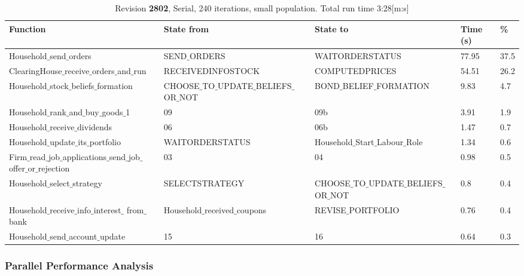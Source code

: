 \begin{landscape}
\begin{table}
\begin{tabular}{|l|l|l|l|l|}\hline
Function & State from & State to & Time (s) & \% \\ \hline
Household$\_$send$\_$orders & SEND$\_$ORDERS & WAITORDERSTATUS &  77.95 & 37.5 \\ \hline
ClearingHouse$\_$receive$\_$orders$\_$and$\_$run & RECEIVEDINFOSTOCK & COMPUTEDPRICES &   54.51 & 26.2 \\ \hline
Household$\_$stock$\_$beliefs$\_$formation & \parbox[t]{6cm}{CHOOSE$\_$TO$\_$UPDATE$\_$BELIEFS$\_$\\[-4pt]OR$\_$NOT} & BOND$\_$BELIEF$\_$FORMATION &   9.83 & 4.7 \\ \hline
Household$\_$rank$\_$and$\_$buy$\_$goods$\_$1 & 09 & 09b &   3.91 & 1.9 \\ \hline
Household$\_$receive$\_$dividends & 06 & 06b &   1.47 & 0.7 \\ \hline
Household$\_$update$\_$its$\_$portfolio & WAITORDERSTATUS & Household$\_$Start$\_$Labour$\_$Role &   1.34 & 0.6 \\ \hline
\parbox[t]{6cm}{Firm$\_$read$\_$job$\_$applications$\_$send$\_$job$\_$\\[-4pt]offer$\_$or$\_$rejection} & 03 & 04 &   0.98 & 0.5 \\ \hline
Household$\_$select$\_$strategy & SELECTSTRATEGY & CHOOSE$\_$TO$\_$UPDATE$\_$BELIEFS$\_$OR$\_$NOT &   0.8 & 0.4 \\ \hline
\parbox[t]{6cm}{Household$\_$receive$\_$info$\_$interest$\_$\\[-4pt]from$\_$bank} & Household$\_$received$\_$coupons & REVISE$\_$PORTFOLIO &   0.76 & 0.4 \\ \hline
Household$\_$send$\_$account$\_$update & 15 & 16 &  0.64 & 0.3 \\ \hline
\end{tabular}
\caption{Revision \textbf{2802}, Serial, 240 iterations, small population. Total run time 3:28[m:s]}
\end{table}

\end{landscape}

\subsubsection{Parallel Performance Analysis}

